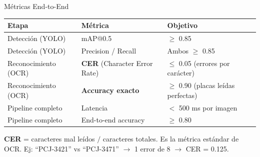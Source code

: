 \begin{frame}[shrink]{M\'etricas End-to-End}
  \vspace{8pt}
  {\footnotesize
  \begin{tabular}{@{}p{3.0cm} p{4.0cm} p{5.0cm}@{}}
    \toprule
    \textbf{Etapa} & \textbf{M\'etrica} & \textbf{Objetivo} \\
    \midrule
    \rowcolor{arcaGray}
    Detecci\'on (YOLO)
    & mAP@0.5
    & $\geq$ 0.85 \\
    Detecci\'on (YOLO)
    & Precision / Recall
    & Ambos $\geq$ 0.85 \\
    \rowcolor{arcaGray}
    Reconocimiento (OCR)
    & \textbf{CER} (Character Error Rate)
    & $\leq$ 0.05 (errores por car\'acter) \\
    Reconocimiento (OCR)
    & \textbf{Accuracy exacto}
    & $\geq$ 0.90 (placas le\'idas perfectas) \\
    \rowcolor{arcaGray}
    Pipeline completo
    & Latencia
    & $<$ 500 ms por imagen \\
    Pipeline completo
    & End-to-end accuracy
    & $\geq$ 0.80 \\
    \bottomrule
  \end{tabular}
  }

  \vspace{10pt}
  \begin{tcolorbox}[colback=arcaGray, colframe=arcaRed, boxrule=0.5pt,
    arc=2pt, left=6pt, right=6pt, top=4pt, bottom=4pt]
    {\scriptsize\color{arcaDark}
    \faKey\hspace{4pt} \textbf{CER} = caracteres mal le\'idos $/$ caracteres
    totales. Es la m\'etrica est\'andar de OCR. Ej: ``PCJ-3421'' vs
    ``PCJ-3471'' $\to$ 1 error de 8 $\to$ CER = 0.125.}
  \end{tcolorbox}
\end{frame}


